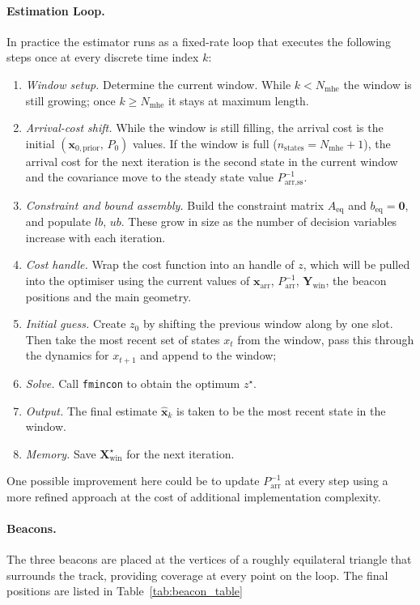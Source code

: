 \documentclass{article}
\begin{document}
\paragraph{Estimation Loop.}
In practice the estimator runs as a fixed-rate loop that executes the following steps once at every discrete time index $k$:

\begin{enumerate}
    \item \emph{Window setup.} Determine the current window. While $k < N_{\text{mhe}}$ the window is still growing; once $k \geq N_{\text{mhe}}$ it stays at maximum length.
    \item \emph{Arrival-cost shift.} While the window is still filling, the arrival cost is the initial $(\mathbf{x}_{0,\text{prior}},\,P_{0})$ values. If the window is full ($n_{\text{states}} = N_{\text{mhe}}+1$), the arrival cost for the next iteration is the second state in the current window and the covariance move to the steady state value $P_{\text{arr,ss}}^{-1}$. 
    \item \emph{Constraint and bound assembly.} Build the constraint matrix $A_{\text{eq}}$ and $b_{\text{eq}}=\mathbf{0}$, and populate $lb,\, ub$. These grow in size as the number of decision variables increase with each iteration. 
    \item \emph{Cost handle.} Wrap the cost function into an handle of $z$, which will be pulled into the optimiser using the current values of $\mathbf{x}_{\text{arr}}$, $P_{\text{arr}}^{-1}$, $\mathbf{Y}_{\text{win}}$, the beacon positions and the main geometry.
    \item \emph{Initial guess.} Create $z_{0}$ by shifting the previous window along by one slot. Then take the most recent set of states $x_t$ from the window, pass this through the dynamics for $x_{t+1}$ and append to the window;
    \item \emph{Solve.} Call \texttt{fmincon} to obtain the optimum $z^{\star}$.
    \item \emph{Output.} The final estimate $\widehat{\mathbf{x}}_{k}$ is taken to be the most recent state in the window.
    \item \emph{Memory.} Save $\mathbf{X}_{\text{win}}^{\star}$ for the next iteration.
\end{enumerate}
One possible improvement here could be to update $P_{\text{arr}}^{-1}$ at every step using a more refined approach at the cost of additional implementation complexity.

\paragraph{Beacons.}
The three beacons are placed at the vertices of a roughly equilateral triangle that surrounds the track, providing coverage at every point on the loop. The final positions are listed in Table~\ref{tab:beacon_table}
\end{document}
